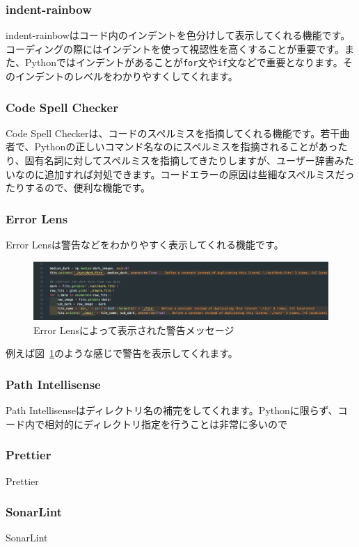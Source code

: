 \subsubsection{indent-rainbow}
indent-rainbowはコード内のインデントを色分けして表示してくれる機能です。コーディングの際にはインデントを使って視認性を高くすることが重要です。また、Pythonではインデントがあることが\texttt{for}文や\texttt{if}文などで重要となります。そのインデントのレベルをわかりやすくしてくれます。

\subsubsection{Code Spell Checker}
Code Spell Checkerは、コードのスペルミスを指摘してくれる機能です。若干曲者で、Pythonの正しいコマンド名なのにスペルミスを指摘されることがあったり、固有名詞に対してスペルミスを指摘してきたりしますが、ユーザー辞書みたいなのに追加すれば対処できます。コードエラーの原因は些細なスペルミスだったりするので、便利な機能です。

\subsubsection{Error Lens}
Error Lensは警告などをわかりやすく表示してくれる機能です。
\begin{figure}
	\centering
	\includegraphics[width=0.8\linewidth]{./fig/appendix/error_lens.png}
	\caption{Error Lensによって表示された警告メッセージ}
	\label{fig:error_lens}
\end{figure}
例えば図~\ref{fig:error_lens}のような感じで警告を表示してくれます。

\subsubsection{Path Intellisense}
Path Intellisenseはディレクトリ名の補完をしてくれます。Pythonに限らず、コード内で相対的にディレクトリ指定を行うことは非常に多いので

\subsubsection{Prettier}
Prettier

\subsubsection{SonarLint}
SonarLint

